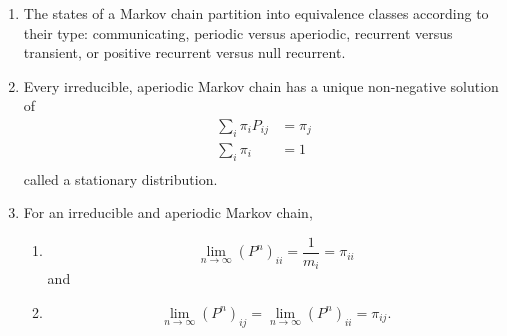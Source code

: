 \documentclass[12pt]{article}
\begin{document}
\begin{enumerate}
    \item
        The states of a Markov chain partition into equivalence classes
        according to their type:  communicating, periodic versus
        aperiodic, recurrent versus transient, or positive recurrent
        versus null recurrent.
    \item
        Every irreducible, aperiodic Markov chain has a unique
        non-negative solution of
        \begin{align*}
            \sum\limits_{i} \pi_{i} P_{ij} &= \pi_{j} \\
            \sum\limits_{i} \pi_{i} &= 1 \\
        \end{align*}
        called a stationary distribution.
    \item
        For an irreducible and aperiodic Markov chain,
        \begin{enumerate}
            \item
                \[
                    \lim_{n \to \infty} (P^{n})_{ii} = \frac{1}{m_i} =
                    \pi_{ii}
                \] and
            \item
                \[
                    \lim_{n \to \infty} (P^{n})_{ij} = \lim_{n \to
                    \infty} (P^ {n})_{ii} =\pi_{ij}.
                \]
        \end{enumerate}
\end{enumerate}

\hr

\end{document}
